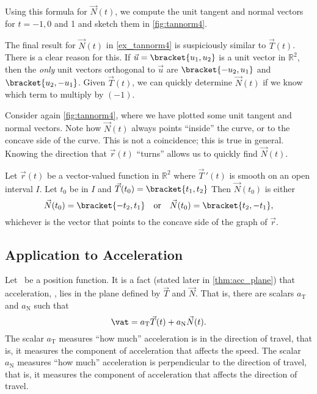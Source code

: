 {Using this formula for $\vec N(t)$, we compute the unit tangent and normal vectors for $t=-1,0$ and 1 and sketch them in \autoref{fig:tannorm4}.}

The final result for $\vec N(t)$ in \autoref{ex_tannorm4} is suspiciously similar to $\vec T(t)$. There is a clear reason for this. If $\vec u =\bracket{u_1,u_2}$ is a unit vector in $\mathbb{R}^2$, then the \textit{only} unit vectors orthogonal to $\vec u$ are $\bracket{-u_2,u_1}$ and $\bracket{u_2,-u_1}$. Given $\vec T(t)$, we can quickly determine $\vec N(t)$ if we know which term to multiply by $(-1)$.

Consider again \autoref{fig:tannorm4}, where we have plotted some unit tangent and normal vectors. Note how $\vec N(t)$ always points ``inside'' the curve, or to the concave side of the curve. This is not a coincidence; this is true in general. Knowing the direction that $\vec r(t)$ ``turns'' allows us to quickly find $\vec N(t)$.


{Let $\vec r(t)$ be a vector-valued function in $\mathbb{R}^2$ where $\vec T\,'(t)$ is smooth on an open interval $I$. Let $t_0$ be in $I$ and $\vec T(t_0) =\bracket{t_1,t_2}$ Then $\vec N(t_0)$ is either
\[\vec N(t_0) =\bracket{-t_2,t_1}\quad \text{or}\quad \vec N(t_0) =\bracket{t_2,-t_1},\]
whichever is the vector that points to the concave side of the graph of $\vec r$.
}

\subsection{Application to Acceleration}

Let \vrt\ be a position function. It is a fact (stated later in \autoref{thm:acc_plane}) %
 that acceleration, \vat, lies in the plane defined by $\vec T$ and $\vec N$. That is, there are scalars $a_{\text{T}}$ and $a_{\text{N}}$ such that 
\[\vat = a_{\text{T}}\vec T(t) + a_{\text{N}}\vec N(t).\]
The scalar $a_{\text{T}}$ measures ``how much'' acceleration is in the direction of travel, that is, it measures the component of acceleration that affects the speed. The scalar $a_{\text{N}}$ measures ``how much'' acceleration is perpendicular to the direction of travel, that is, it measures the component of acceleration that affects the direction of travel.

